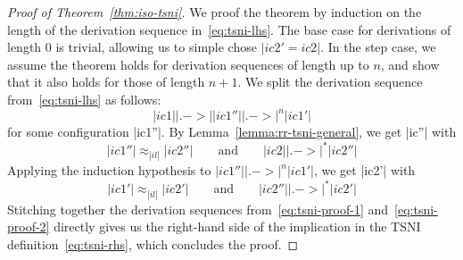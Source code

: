 \begin{proof}[Proof of Theorem~\ref{thm:iso-tsni}]
  We proof the theorem by induction on the length of the derivation sequence in~\eqref{eq:tsni-lhs}.
  The base case for derivations
  of length 0 is trivial, allowing
  us to simple chose $|ic2'=ic2|$.  In the step case, we assume
  the theorem holds for derivation sequences of length up to $n$, and show that it also
  holds for those of length $n+1$.  We split the derivation sequence from~\eqref{eq:tsni-lhs} as follows:
  \[
  |ic1| |.->| |ic1''| |.->|^n |ic1'|
  \]
  for some configuration |ic1''|.  By Lemma~\ref{lemma:rr-tsni-general}, we get
  |ic''| with
  \begin{equation} \label{eq:tsni-proof-1}
  |ic1''| \approx_{|il|} |ic2''|
  \qquad \text{and} \qquad
  |ic2| |.->|^* |ic2''|
  \end{equation}
  Applying the induction hypothesis to
  $|ic1''| |.->|^n |ic1'|$, we get |ic2'| with
  \begin{equation} \label{eq:tsni-proof-2}
  |ic1'| \approx_{|il|} |ic2'|
  \qquad \text{and} \qquad
  |ic2''| |.->|^* |ic2'|
  \end{equation}
  Stitching together the derivation sequences from~\eqref{eq:tsni-proof-1} and~\eqref{eq:tsni-proof-2} directly gives
  us the right-hand side of the implication in the TSNI
  definition~\eqref{eq:tsni-rhs}, which concludes the proof.
\end{proof}
